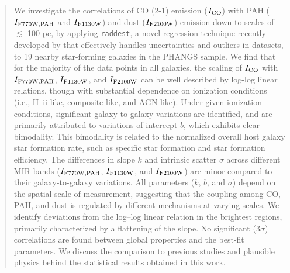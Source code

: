 \documentclass[twocolumn]{aastex7}
\newcommand{\edit}[1]{#1}
\newcommand{\ICO}{{I_{\rm CO}}}
\newcommand{\Iblue}{{I_{\rm F770W, PAH}}}
\newcommand{\Igreen}{{I_{\rm F1130W}}}
\newcommand{\Ired}{{I_{\rm F2100W}}}
\newcommand{\HII}{H~{\sc ii}}
\newcommand{\raddest}{{\tt raddest}}
\begin{document}
\author[0009-0004-6271-4321]{Tao Jing}

\author[0000-0002-8711-8970]{Cheng Li}




\begin{abstract}
We investigate the correlations of CO (2-1) emission ($\ICO$) with PAH ($\Iblue$ and $\Igreen$) and dust ($\Ired$) emission down to scales of $\lesssim$ 100 pc, by applying \raddest, a novel regression technique recently developed by \citet{Jing2024} that effectively handles uncertainties and outliers in datasets, to 19 nearby star-forming galaxies in the PHANGS sample. We find that for the majority of the data points in all galaxies, the scaling of $\ICO$ with $\Iblue$, $\Igreen$, and $\Ired$ can be well described by log-log linear relations, though with substantial dependence on ionization conditions (i.e., \HII-like, composite-like, and AGN-like). Under given ionization conditions, significant galaxy-to-galaxy variations are identified, and are primarily attributed to variations of intercept $b$, which exhibits clear bimodality. \edit{This bimodality is related to the normalized overall host galaxy star formation rate, such as specific star formation and star formation efficiency.} The differences in slope $k$ and intrinsic scatter $\sigma$ across different MIR bands ($\Iblue$, $\Igreen$, and $\Ired$) are minor compared to their galaxy-to-galaxy variations. All parameters ($k$, $b$, and $\sigma$) depend on the spatial scale of measurement, suggesting that the coupling among CO, PAH, and dust is regulated by different mechanisms at varying scales. \edit{We identify deviations from the log–log linear relation in the brightest regions, primarily characterized by a flattening of the slope.} No significant (3$\sigma$) correlations are found between global properties and the best-fit parameters. We discuss the comparison to previous studies and plausible physics behind the statistical results obtained in this work. %
\end{abstract}
\end{document}
